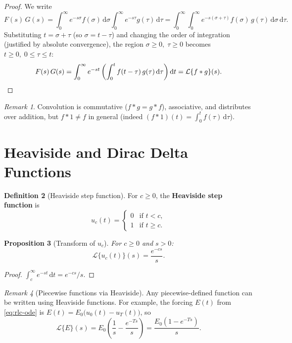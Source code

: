 \documentclass[12pt,a4paper,openany]{book}
\theoremstyle{definition}
\newtheorem{definition}{Definition}[chapter]
\theoremstyle{plain}
\newtheorem{proposition}[definition]{Proposition}
\theoremstyle{remark}
\newtheorem{remark}[definition]{Remark}
\newcommand{\dd}{\mathrm{d}}
\begin{document}
\begin{proof}
We write
\[
  F(s)\,G(s)
  = \int_0^\infty e^{-s\sigma}f(\sigma)\,\dd\sigma
    \int_0^\infty e^{-s\tau}g(\tau)\,\dd\tau
  = \int_0^\infty\!\int_0^\infty e^{-s(\sigma+\tau)}f(\sigma)\,g(\tau)
    \,\dd\sigma\,\dd\tau.
\]
Substituting \(t=\sigma+\tau\) (so \(\sigma=t-\tau\)) and changing the order
of integration (justified by absolute convergence), the region
\(\sigma\ge 0,\;\tau\ge 0\) becomes \(t\ge 0,\;0\le\tau\le t\):
\[
  F(s)\,G(s) = \int_0^\infty e^{-st}\left(\int_0^t f(t-\tau)\,g(\tau)
  \,\dd\tau\right)\dd t = \mathcal{L}\{f*g\}(s). \qedhere
\]
\end{proof}

\begin{remark}
\label{rem:convolution-properties}
Convolution is commutative (\(f*g=g*f\)), associative, and distributes over
addition, but \(f*1\neq f\) in general (indeed \((f*1)(t)=\int_0^t f(\tau)\,\dd\tau\)).
\end{remark}

\section{Heaviside and Dirac Delta Functions}
\label{sec:heaviside-dirac}

\begin{definition}[Heaviside step function]
\label{def:heaviside}
For \(c\ge 0\), the \textbf{Heaviside step function} is
\[
  u_c(t) = \begin{cases} 0 & \text{if } t<c, \\ 1 & \text{if } t\ge c. \end{cases}
\]
\end{definition}

\begin{proposition}[Transform of \(u_c\)]
\label{prop:laplace-heaviside}
For \(c\ge 0\) and \(s>0\):
\[
  \mathcal{L}\{u_c(t)\}(s) = \frac{e^{-cs}}{s}.
\]
\end{proposition}

\begin{proof}
\(\displaystyle\int_c^\infty e^{-st}\,\dd t = e^{-cs}/s.\)
\end{proof}

\begin{remark}[Piecewise functions via Heaviside]
\label{rem:piecewise-heaviside}
Any piecewise-defined function can be written using Heaviside functions. For
example, the forcing \(E(t)\) from \eqref{eq:rlc-ode} is
\(E(t)=E_0\bigl(u_0(t)-u_T(t)\bigr)\), so
\[
  \mathcal{L}\{E\}(s) = E_0\left(\frac{1}{s}-\frac{e^{-Ts}}{s}\right)
  = \frac{E_0(1-e^{-Ts})}{s}.
\]
\end{remark}
\end{document}
